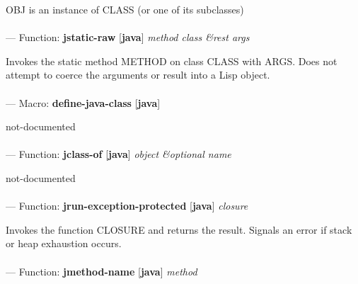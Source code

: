 \begin{adjustwidth}{5em}{5em}
OBJ is an instance of CLASS (or one of its subclasses)
\end{adjustwidth}

\paragraph{}
\label{JAVA:JSTATIC-RAW}
--- Function: \textbf{jstatic-raw} [\textbf{java}] \textit{method class \&rest args}

\begin{adjustwidth}{5em}{5em}
Invokes the static method METHOD on class CLASS with ARGS. Does not attempt to coerce the arguments or result into a Lisp object.
\end{adjustwidth}

\paragraph{}
\label{JAVA:DEFINE-JAVA-CLASS}
--- Macro: \textbf{define-java-class} [\textbf{java}] \textit{}

\begin{adjustwidth}{5em}{5em}
not-documented
\end{adjustwidth}

\paragraph{}
\label{JAVA:JCLASS-OF}
--- Function: \textbf{jclass-of} [\textbf{java}] \textit{object \&optional name}

\begin{adjustwidth}{5em}{5em}
not-documented
\end{adjustwidth}

\paragraph{}
\label{JAVA:JRUN-EXCEPTION-PROTECTED}
--- Function: \textbf{jrun-exception-protected} [\textbf{java}] \textit{closure}

\begin{adjustwidth}{5em}{5em}
Invokes the function CLOSURE and returns the result.  Signals an error if stack or heap exhaustion occurs.
\end{adjustwidth}

\paragraph{}
\label{JAVA:JMETHOD-NAME}
--- Function: \textbf{jmethod-name} [\textbf{java}] \textit{method}

